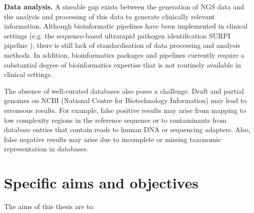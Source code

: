 \textbf{Data analysis.} A sizeable gap exists between the generation of NGS data and the analysis and processing of this data to generate clinically relevant information. Although bioinformatic pipelines have been implemented in clinical settings (e.g. the sequence-based ultrarapid pathogen identification SURPI pipeline \parencite{Wilson2019}), there is still lack of standardisation of data processing and analysis methods. In addition, bioinformatics packages and pipelines currently require a substantial degree of bioinformatics expertise that is not routinely available in clinical settings. 

The absence of well-curated databases also poses a challenge. Draft and partial genomes on NCBI (National Centre for Biotechnology Information) may lead to erroneous results. For example, false positive results may arise from mapping to low complexity regions in the reference sequence or to contaminants from database entries that contain reads to human DNA or sequencing adapters. Also, false negative results may arise due to incomplete or missing taxonomic representation in databases.

\section{Specific aims and objectives}
The aims of this thesis are to:

